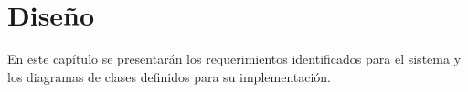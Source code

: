 \chapter{Diseño}
En este capítulo se presentarán los requerimientos identificados para el sistema
y los diagramas de clases definidos para su implementación.



